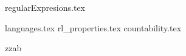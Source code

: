 \documentclass{exam}
\begin{document}

    {regularExpresions.tex}

     {languages.tex}
     {rl_properties.tex}
     {countability.tex}

\begin{questions}

               \printanswers






      \question  zzab




\end{questions}
\end{document}
